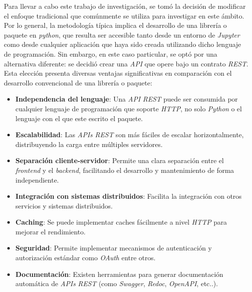 \documentclass[11pt,a4paper,twoside]{thesis}
\begin{document}
Para llevar a cabo este trabajo de investigación, se tomó la decisión de modificar el enfoque tradicional que comúnmente se utiliza para investigar en este ámbito. Por lo general, la metodología típica implica el desarrollo de una librería o paquete en \textit{python}, que resulta ser accesible tanto desde un entorno de \textit{Jupyter} como desde cualquier aplicación que haya sido creada utilizando dicho lenguaje de programación. Sin embargo, en este caso particular, se optó por una alternativa diferente: se decidió crear una \textit{API} que opere bajo un contrato \textit{REST}. Esta elección presenta diversas ventajas significativas en comparación con el desarrollo convencional de una librería o paquete:


\begin{itemize}
	\setlength{\itemsep}{0pt}
	\setlength{\parskip}{0pt}

	\item \textbf{Independencia del lenguaje}: Una \textit{API REST} puede ser consumida por cualquier lenguaje de programación que soporte \textit{HTTP}, no solo \textit{Python} o el lenguaje con el que este escrito el paquete.

	\item \textbf{Escalabilidad}: Las \textit{APIs REST} son más fáciles de escalar horizontalmente, distribuyendo la carga entre múltiples servidores.

	\item \textbf{Separación cliente-servidor}: Permite una clara separación entre el \textit{frontend} y el \textit{backend}, facilitando el desarrollo y mantenimiento de forma independiente.

	\item \textbf{Integración con sistemas distribuidos}: Facilita la integración con otros servicios y sistemas distribuidos.

	\item \textbf{Caching}: Se puede implementar caches fácilmente a nivel \textit{HTTP} para mejorar el rendimiento.

	\item \textbf{Seguridad}: Permite implementar mecanismos de autenticación y autorización estándar como \textit{OAuth} entre otros.

	\item \textbf{Documentación}: Existen herramientas para generar documentación automática de \textit{APIs REST} (como \textit{Swagger}, \textit{Redoc}, \textit{OpenAPI}, etc..).
\end{itemize}
\vfill
\end{document}
